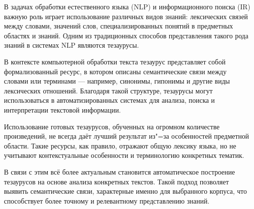 \documentclass[coursework]{SCWorks}
\begin{document}

\date{2025}

\maketitle

\secNumbering

\tableofcontents




\intro
В задачах обработки естественного языка (NLP) и информационного поиска (IR) важную роль играет использование различных видов знаний: лексических связей между словами, значений слов, специализированных понятий в предметных областях и знаний. Одним из традиционных способов представления такого рода знаний в системах NLP являются тезаурусы\cite{loukachevitch2021ruthes}.

В контексте компьютерной обработки текста тезаурус представляет собой формализованный ресурс, в котором описаны семантические связи между словами или терминами — например, синонимы, гипонимы и другие виды лексических отношений. Благодаря такой структуре, тезаурусы могут использоваться в автоматизированных системах для анализа, поиска и интерпретации текстовой информации.

Использование готовых тезаурусов, обученных на огромном количестве произведений, не всегда даёт лучший результат из"=за особенностей предметной области. Такие ресурсы, как правило, отражают общую лексику языка, но не учитывают контекстуальные особенности и терминологию конкретных тематик.

В связи с этим всё более актуальным становится автоматическое построение тезаурусов на основе анализа конкретных текстов. Такой подход позволяет выявить семантические связи, характерные именно для выбранного корпуса, что способствует более точному и релевантному представлению знаний.
\end{document}

